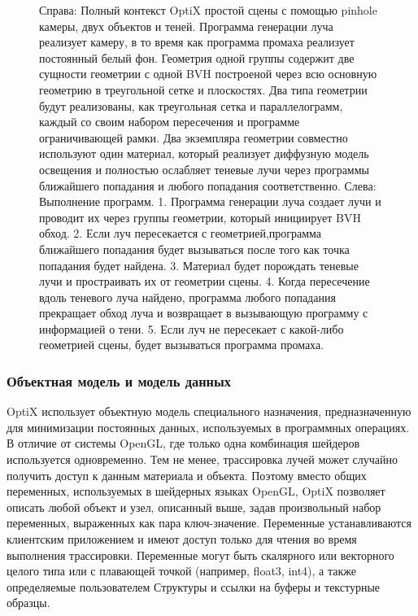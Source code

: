 \begin{figure}[h!]
\caption{\small{Справа: Полный контекст OptiX простой сцены с помощью pinhole камеры, двух объектов и теней.
Программа генерации луча реализует камеру, в то время как программа промаха реализует постоянный белый фон.
Геометрия одной группы содержит две сущности геометрии с одной BVH построеной через всю основную геометрию в треугольной сетке и плоскостях.
Два типа геометрии будут реализованы, как треугольная сетка и параллелограмм, каждый со своим набором пересечения и программе ограничивающей рамки.
Два экземпляра геометрии совместно используют один материал, который реализует диффузную модель освещения и полностью ослабляет теневые лучи через программы ближайшего попадания и любого попадания соответственно.
Слева: Выполнение программ. 1. Программа генерации луча создает лучи и проводит их через группы геометрии, который инициирует BVH обход.
2. Если луч пересекается с геометрией,программа ближайшего попадания будет вызываться после того как точка попадания будет найдена.
3. Материал будет порождать теневые лучи и простраивать их от геометрии сцены.
4. Когда пересечение вдоль теневого луча найдено, программа любого попадания прекращает обход луча и возвращает в вызывающую программу с информацией о тени.
5. Если луч не пересекает с какой-либо геометрией сцены, будет вызываться программа промаха.}}
\label{fig1}
\end{figure}

\subsubsection {Объектная модель и модель данных}
OptiX использует объектную модель специального назначения, предназначенную для минимизации постоянных данных, используемых в программных операциях.
В отличие от системы OpenGL, где только одна комбинация шейдеров используется одновременно.
Тем не менее, трассировка лучей может случайно получить доступ к данным материала и объекта. Поэтому вместо общих переменных, используемых в шейдерных языках OpenGL, OptiX позволяет описать любой объект и узел, описанный выше, задав произвольный набор переменных, выраженных как пара ключ-значение.
Переменные устанавливаются клиентским приложением и имеют доступ только для чтения во время выполнения трассировки.
Переменные могут быть скалярного или векторного целого типа или с плавающей точкой (например, float3, int4), а также определяемые пользователем Структуры и ссылки на буферы и текстурные образцы.


